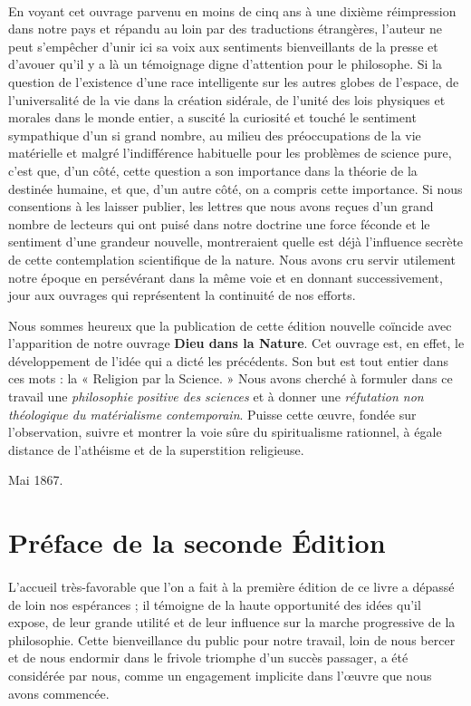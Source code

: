 \documentclass[a4paper, 11pt, oneside]{article}
\begin{document}
\paragraph{}
En voyant cet ouvrage parvenu en moins de cinq ans à une dixième réimpression dans notre pays et répandu au loin par des traductions étrangères, l'auteur ne peut s'empêcher d'unir ici sa voix aux sentiments bienveillants de la presse et d'avouer qu'il y a là un témoignage digne d'attention pour le philosophe. Si la question de l'existence d'une race intelligente sur les autres globes de l'espace, de l'universalité de la vie dans la création sidérale, de l'unité des lois physiques et morales dans le monde entier, a suscité la curiosité et touché le sentiment sympathique d'un si grand nombre, au milieu des préoccupations de la vie matérielle et malgré l'indifférence habituelle pour les problèmes de science pure, c'est que, d'un côté, cette question a son importance dans la théorie de la destinée humaine, et que, d'un autre côté, on a compris cette importance. Si nous consentions à les laisser publier, les lettres que nous avons reçues d'un grand nombre de lecteurs qui ont puisé dans notre doctrine une force féconde et le sentiment d'une grandeur nouvelle, montreraient quelle est déjà l'influence secrète de cette contemplation scientifique de la nature. Nous avons cru servir utilement notre époque en persévérant dans la même voie et en donnant successivement, jour aux ouvrages qui représentent la continuité de nos efforts.

Nous sommes heureux que la publication de cette édition nouvelle coïncide avec l'apparition de notre ouvrage \textbf{Dieu dans la Nature}. Cet ouvrage est, en effet, le développement de l'idée qui a dicté les précédents. Son but est tout entier dans ces mots : la « Religion par la Science. » Nous avons cherché à formuler dans ce travail une \emph{philosophie positive des sciences} et à donner une \emph{réfutation non théologique du matérialisme contemporain}. Puisse cette œuvre, fondée sur l'observation, suivre et montrer la voie sûre du spiritualisme rationnel, à égale distance de l'athéisme et de la superstition religieuse.

\bigskip

Mai 1867.
\clearpage
\section*{Préface de la seconde Édition}
\paragraph{}
L'accueil très-favorable que l'on a fait à la première édition de ce livre a dépassé de loin nos espérances ; il témoigne de la haute opportunité des idées qu'il expose, de leur grande utilité et de leur influence sur la marche progressive de la philosophie. Cette bienveillance du public pour notre travail, loin de nous bercer et de nous endormir dans le frivole triomphe d'un succès passager, a été considérée par nous, comme un engagement implicite dans l'œuvre que nous avons commencée.
\end{document}
